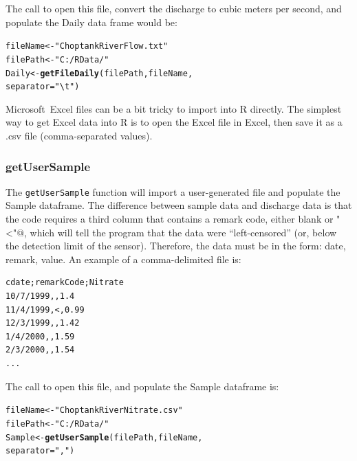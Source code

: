 \documentclass[a4paper,11pt]{article}\usepackage[]{graphicx}\usepackage[]{color}
\makeatletter
\newcommand{\hlstr}[1]{\textcolor[rgb]{0.192,0.494,0.8}{#1}}%
\newcommand{\hlstd}[1]{\textcolor[rgb]{0.345,0.345,0.345}{#1}}%
\newcommand{\hlkwb}[1]{\textcolor[rgb]{0.69,0.353,0.396}{#1}}%
\newcommand{\hlkwc}[1]{\textcolor[rgb]{0.333,0.667,0.333}{#1}}%
\newcommand{\hlkwd}[1]{\textcolor[rgb]{0.737,0.353,0.396}{\textbf{#1}}}%
\newenvironment{kframe}{%
 \def\at@end@of@kframe{}%
 \ifinner\ifhmode%
  \def\at@end@of@kframe{\end{minipage}}%
  \begin{minipage}{\columnwidth}%
 \fi\fi%
 \def\FrameCommand##1{\hskip\@totalleftmargin \hskip-\fboxsep
 \colorbox{shadecolor}{##1}\hskip-\fboxsep
     \hskip-\linewidth \hskip-\@totalleftmargin \hskip\columnwidth}%
 \MakeFramed {\advance\hsize-\width
   \@totalleftmargin\z@ \linewidth\hsize
   \@setminipage}}%
 {\par\unskip\endMakeFramed%
 \at@end@of@kframe}
\newenvironment{knitrout}{}{} %
\makeatother
\begin{document}
The call to open this file, convert the discharge to cubic meters per second, and populate the Daily data frame would be:
\begin{knitrout}
\color{fgcolor}\begin{kframe}
\begin{alltt}
\hlstd{fileName} \hlkwb{<-} \hlstr{"ChoptankRiverFlow.txt"}
\hlstd{filePath} \hlkwb{<-}  \hlstr{"C:/RData/"}
\hlstd{Daily} \hlkwb{<-}\hlkwd{getFileDaily}\hlstd{(filePath,fileName,}
                    \hlkwc{separator}\hlstd{=}\hlstr{"\textbackslash{}t"}\hlstd{)}
\end{alltt}
\end{kframe}
\end{knitrout}

Microsoft\textregistered\ Excel files can be a bit tricky to import into R directly. The simplest way to get Excel data into R is to open the Excel file in Excel, then save it as a .csv file (comma-separated values). 

\FloatBarrier

\subsubsection{getUserSample}
\label{sec:SampleFile}

The \texttt{getUserSample} function will import a user-generated file and populate the Sample dataframe. The difference between sample data and discharge data is that the code requires a third column that contains a remark code, either blank or \verb@"<"@, which will tell the program that the data were \enquote{left-censored} (or, below the detection limit of the sensor). Therefore, the data must be in the form: date, remark, value.   An example of a comma-delimited file is:

\singlespacing
\begin{verbatim}
cdate;remarkCode;Nitrate
10/7/1999,,1.4
11/4/1999,<,0.99
12/3/1999,,1.42
1/4/2000,,1.59
2/3/2000,,1.54
...
\end{verbatim}

The call to open this file, and populate the Sample dataframe is:
\begin{knitrout}
\color{fgcolor}\begin{kframe}
\begin{alltt}
\hlstd{fileName} \hlkwb{<-} \hlstr{"ChoptankRiverNitrate.csv"}
\hlstd{filePath} \hlkwb{<-}  \hlstr{"C:/RData/"}
\hlstd{Sample} \hlkwb{<-}\hlkwd{getUserSample}\hlstd{(filePath,fileName,}
                                \hlkwc{separator}\hlstd{=}\hlstr{","}\hlstd{)}
\end{alltt}
\end{kframe}
\end{knitrout}
\end{document}
